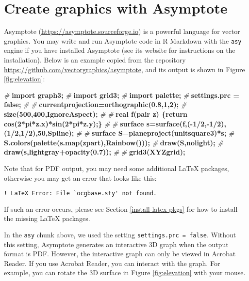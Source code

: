 \documentclass[
  11pt,
]{krantz}
\newenvironment{Shaded}{\begin{snugshade}}{\end{snugshade}}
\newcommand{\ErrorTok}[1]{\textcolor[rgb]{0.14,0.14,0.14}{\textbf{#1}}}
\newcommand{\PreprocessorTok}[1]{\textcolor[rgb]{0.37,0.37,0.37}{\textit{#1}}}
\begin{document}
\hypertarget{eng-asy}{%
\section{Create graphics with Asymptote}\label{eng-asy}}

Asymptote (\url{https://asymptote.sourceforge.io}) is a powerful language for vector graphics. You may write and run Asymptote code in R Markdown with the \texttt{asy} engine if you have installed Asymptote (see its website for instructions on the installation). Below is an example copied from the repository \url{https://github.com/vectorgraphics/asymptote}, and its output is shown in Figure \ref{fig:elevation}:

\begin{Shaded}
\begin{Highlighting}[]
\PreprocessorTok{# }\ErrorTok{import graph3;}
\PreprocessorTok{# }\ErrorTok{import grid3;}
\PreprocessorTok{# }\ErrorTok{import palette;}
\PreprocessorTok{# }\ErrorTok{settings.prc = false;}
\PreprocessorTok{#}\ErrorTok{ }
\PreprocessorTok{# }\ErrorTok{currentprojection=orthographic(0.8,1,2);}
\PreprocessorTok{# }\ErrorTok{size(500,400,IgnoreAspect);}
\PreprocessorTok{#}\ErrorTok{ }
\PreprocessorTok{# }\ErrorTok{real f(pair z) \{return cos(2*pi*z.x)*sin(2*pi*z.y);\}}
\PreprocessorTok{#}\ErrorTok{ }
\PreprocessorTok{# }\ErrorTok{surface s=surface(f,(-1/2,-1/2),(1/2,1/2),50,Spline);}
\PreprocessorTok{#}\ErrorTok{ }
\PreprocessorTok{# }\ErrorTok{surface S=planeproject(unitsquare3)*s;}
\PreprocessorTok{# }\ErrorTok{S.colors(palette(s.map(zpart),Rainbow()));}
\PreprocessorTok{# }\ErrorTok{draw(S,nolight);}
\PreprocessorTok{# }\ErrorTok{draw(s,lightgray+opacity(0.7));}
\PreprocessorTok{#}\ErrorTok{ }
\PreprocessorTok{# }\ErrorTok{grid3(XYZgrid);}
\end{Highlighting}
\end{Shaded}

Note that for PDF output, you may need some additional LaTeX packages, otherwise you may get an error that looks like this:

\begin{verbatim}
! LaTeX Error: File `ocgbase.sty' not found.
\end{verbatim}

If such an error occurs, please see Section \ref{install-latex-pkgs} for how to install the missing LaTeX packages.

In the \texttt{asy} chunk above, we used the setting \texttt{settings.prc\ =\ false}. Without this setting, Asymptote generates an interactive 3D graph when the output format is PDF. However, the interactive graph can only be viewed in Acrobat Reader. If you use Acrobat Reader, you can interact with the graph. For example, you can rotate the 3D surface in Figure \ref{fig:elevation} with your mouse.
\end{document}
